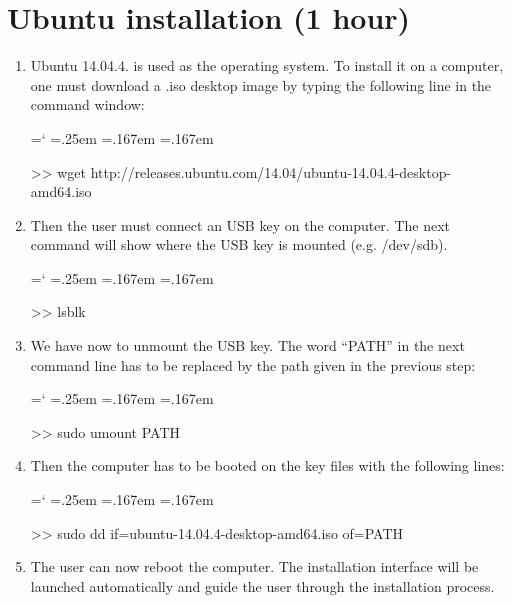 \documentclass[12pt]{report}
\DeclareRobustCommand*{\ttfamily}{
  \origttfamily
  \hyphenchar\font=`\-\relax
  \fontdimen3\font=.25em\relax
  \fontdimen4\font=.167em\relax
  \fontdimen7\font=.167em\relax
}
\newenvironment{code}{\ttfamily}{}
\begin{document}
\section{Ubuntu installation (1 hour)}

\begin{enumerate}
\item Ubuntu 14.04.4. is used as the operating system. To install it on a computer, one must download a .iso desktop image by typing the following line in the command window:

\begin{code}
 >> wget http://releases.ubuntu.com/14.04/ubuntu-14.04.4-desktop-amd64.iso
\end{code}

\item Then the user must connect an USB key on the computer. The next command will show where the USB key is mounted (e.g. /dev/sdb).

\begin{code}
>> lsblk
\end{code}

\item We have now to unmount the USB key. The word ``PATH'' in the next command line has to be replaced by the path given in the previous step:

\begin{code}
>> sudo umount PATH
\end{code}

\item Then the computer has to be booted on the key files with the following lines:

\begin{code}
>> sudo dd if=ubuntu-14.04.4-desktop-amd64.iso of=PATH
\end{code}

\item The user can now reboot the computer. The installation interface will be launched automatically and guide the user through the installation process.
\end{enumerate}
\end{document}
